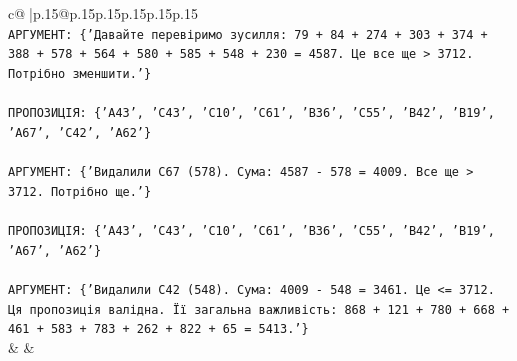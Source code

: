 \documentclass{article}
\begin{document}
{\begin{supertabular}{c@{$\;$}|p{.15\linewidth}@{}p{.15\linewidth}p{.15\linewidth}p{.15\linewidth}p{.15\linewidth}p{.15\linewidth}}
{{{\\ 
\texttt{АРГУМЕНТ: \{'Давайте перевіримо зусилля: 79 + 84 + 274 + 303 + 374 + 388 + 578 + 564 + 580 + 585 + 548 + 230 = 4587. Це все ще > 3712. Потрібно зменшити.'\}} \\
\\ 
\texttt{ПРОПОЗИЦІЯ: \{'A43', 'C43', 'C10', 'C61', 'B36', 'C55', 'B42', 'B19', 'A67', 'C42', 'A62'\}} \\
\\ 
\texttt{АРГУМЕНТ: \{'Видалили C67 (578). Сума: 4587 {-} 578 = 4009. Все ще > 3712. Потрібно ще.'\}} \\
\\ 
\texttt{ПРОПОЗИЦІЯ: \{'A43', 'C43', 'C10', 'C61', 'B36', 'C55', 'B42', 'B19', 'A67', 'A62'\}} \\
\\ 
\texttt{АРГУМЕНТ: \{'Видалили C42 (548). Сума: 4009 {-} 548 = 3461. Це <= 3712. Ця пропозиція валідна. Її загальна важливість: 868 + 121 + 780 + 668 + 461 + 583 + 783 + 262 + 822 + 65 = 5413.'\}} \\
            }
        }
    }
    & & \\ \\


\end{supertabular}}
\end{document}
